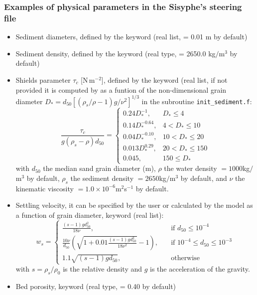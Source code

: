 {\subsubsection{Examples of physical parameters in the Sisyphe's steering file}
\begin{itemize}
\item Sediment diameters, defined by the keyword  (real list, {\ttfamily = 0.01} m by default)
\item Sediment density, defined by the keyword  (real type, {\ttfamily = 2650.0} kg$/$m$^3$ by default)
\item Shields parameter $\tau_c$ [N\,m$^{-2}$], defined by the keyword  (real list, if not provided it is computed by \sisyphe{} as a funtion of the non-dimensional grain diameter $D_*=d_{50}[(\rho_s/\rho-1)g/\nu^2]^{1/3}$ in the subroutine \texttt{init\_sediment.f}:
\begin{equation*}
\frac{\tau_c}{g(\rho_s -\rho)d_{50}}=\left\{\begin{array}{ll}
0.24 D_*^{-1}, & D_* \leq 4 \\
0.14 D_*^{-0.64}, & 4 < D_* \leq 10 \\
 0.04 D_*^{-0.10}, & 10 < D_* \leq 20\\
0.013 D_*^{0.29}, & 20 < D_* \leq 150 \\
0.045, & 150 \leq D_* 
\end{array}
\right.
\end{equation*}
with $d_{50}$ the median sand grain diameter (m), $\rho$ the water density $=1000$kg$/$m$^3$ by default, $\rho_s$ the sediment density $=2650$kg$/$m$^3$ by default, and $\nu$ the kinematic viscosity $=1.0\times 10^{-6}$m$^2$s$^{-1}$ by default.  
  
\item Settling velocity, it can be specified by the user or calculated by the model as a function of grain diameter, keyword  (real list):
  \begin{equation*}
w_{s} = \left\{\begin{array}{ll}
\displaystyle
\frac{(s-1)g d_{50}^2}{18\nu}, & \quad \text{if } d_{50} \leq 10^{-4} \\
\displaystyle
\frac{10\nu}{d_{50}} \left(\sqrt{1+0.01\frac{(s-1)gd_{50}^3}{18\nu^2}}-1\right), & \quad \text{if } 10^{-4} \leq d_{50} \leq 10^{-3}\\ 
\displaystyle
1.1 \sqrt{(s-1)gd_{50}}, & \quad \text{otherwise} 
\end{array}
\right.
\end{equation*}
with $s=\rho_{s}/\rho_0$ is the relative density and $g$ is the acceleration of the gravity.%
\item Bed porosity, keyword  (real type, {\ttfamily = 0.40} by default)  
\end{itemize}



}
